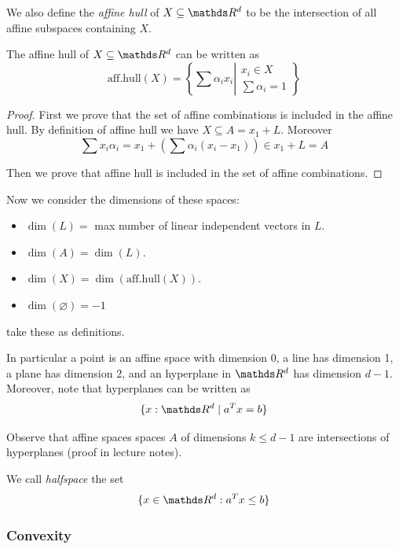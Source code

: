 \documentclass[12pt]{extarticle}
\begin{document}
We also define the \emph{affine hull} of $X \subseteq \R^d$ to be the intersection of all affine
subspaces containing $X$.

\begin{proposition}{}{}
	The affine hull of $X \subseteq \R^d$ can be written as
	\begin{equation}
		\mathrm{aff. hull}(X) =
		\left\{ \sum \alpha_i x_i \left| \substack{x_i \in X \\ \sum \alpha_i = 1} \right. \right \}
	\end{equation}
\end{proposition}
\begin{proof}
	First we prove that the set of affine combinations is included in the affine hull.
	By definition of affine hull we have $X \subseteq A = x_1 + L$.
	Moreover
	\begin{equation}
		\sum x_i \alpha_i = x_1 + \left(\sum \alpha_i (x_i - x_1)\right) \in x_1 + L = A
	\end{equation}

	Then we prove that affine hull is included in the set of affine combinations.
\end{proof}

Now we consider the dimensions of these spaces:
\begin{itemize}
	\item $\dim(L) =$ max number of linear independent vectors in $L$.
	\item $\dim(A) = \dim(L)$.
	\item $\dim(X) = \dim(\mathrm{aff. hull}(X))$.
	\item $\dim(\varnothing) = -1$
\end{itemize}
take these as definitions.

In particular a point is an affine space with dimension 0, a line has dimension 1,
a plane has dimension 2, and an hyperplane in $\R^d$ has dimension $d-1$.
Moreover, note that hyperplanes can be written as
\begin{equation}
	\{ x: \R^d \mid a^T x = b \}
\end{equation}

Observe that affine spaces spaces $A$ of dimensions $k \leq d-1$ are intersections of hyperplanes
(proof in lecture notes).

We call \emph{halfspace} the set
\begin{equation}
	\{x \in \R ^d : a^T x \leq b \}
\end{equation}

\subsubsection{Convexity}
\end{document}
